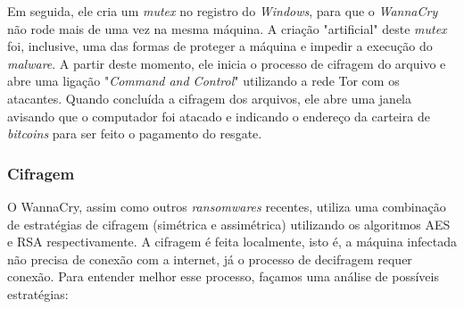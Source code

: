 \documentclass[12pt]{article}
\begin{document}
\noindent
Em seguida, ele cria um \textit{mutex} no registro do \textit{Windows}, para que o \textit{WannaCry} não rode mais de uma vez na mesma máquina. A criação "artificial" deste \textit{mutex} foi, inclusive, uma das formas de proteger a máquina e impedir a execução do \textit{malware}. A partir deste momento, ele inicia o processo de cifragem do arquivo e abre uma ligação "\textit{Command and Control}" utilizando a rede Tor com os atacantes. Quando concluída a cifragem dos arquivos, ele abre uma janela avisando que o computador foi atacado e indicando o endereço da carteira de \textit{bitcoins} para ser feito o pagamento do resgate.

\subsubsection{Cifragem}
O WannaCry, assim como outros \textit{ransomwares} recentes, utiliza uma combinação de estratégias de cifragem (simétrica e assimétrica) utilizando os algoritmos AES e RSA respectivamente. A cifragem é feita localmente, isto é, a máquina infectada não precisa de conexão com a internet, já o processo de decifragem requer conexão. 
Para entender melhor esse processo, façamos uma análise de possíveis estratégias:
\end{document}
